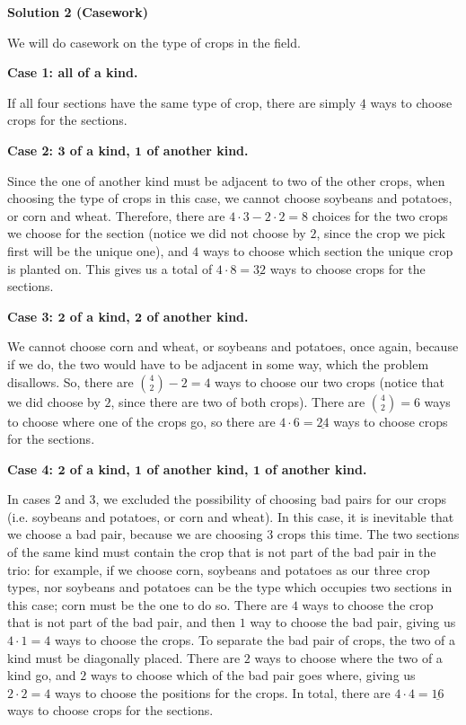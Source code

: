 \begin{enumerate}
\textbf{Solution 2 (Casework)}

We will do casework on the type of crops in the field.

 \textbf{Case 1: all of a kind.}

 If all four sections have the same type of crop, there are simply $\underline{4}$ ways to choose crops for the sections.

 \textbf{Case 2: $\boldsymbol{3}$ of a kind, $\boldsymbol{1}$ of another kind.}

 Since the one of another kind must be adjacent to two of the other crops, when choosing the type of crops in this case, we cannot choose soybeans and potatoes, or corn and wheat. Therefore, there are $4 \cdot 3 - 2 \cdot 2 = 8$ choices for the two crops we choose for the section (notice we did not choose by $2$, since the crop we pick first will be the unique one), and $4$ ways to choose which section the unique crop is planted on. This gives us a total of $4 \cdot 8 = \underline{32}$ ways to choose crops for the sections.

 \textbf{Case 3: $\boldsymbol{2}$ of a kind, $\boldsymbol{2}$ of another kind.}

 We cannot choose corn and wheat, or soybeans and potatoes, once again, because if we do, the two would have to be adjacent in some way, which the problem disallows. So, there are ${4 \choose 2} - 2 = 4$ ways to choose our two crops (notice that we did choose by $2$, since there are two of both crops). There are ${4 \choose 2} = 6$ ways to choose where one of the crops go, so there are $4 \cdot 6 = \underline{24}$ ways to choose crops for the sections.

 \textbf{Case 4: $\boldsymbol{2}$ of a kind, $\boldsymbol{1}$ of another kind, $\boldsymbol{1}$ of another kind.}

 In cases 2 and 3, we excluded the possibility of choosing bad pairs for our crops (i.e. soybeans and potatoes, or corn and wheat). In this case, it is inevitable that we choose a bad pair, because we are choosing $3$ crops this time. The two sections of the same kind must contain the crop that is not part of the bad pair in the trio: for example, if we choose corn, soybeans and potatoes as our three crop types, nor soybeans and potatoes can be the type which occupies two sections in this case; corn must be the one to do so. There are $4$ ways to choose the crop that is not part of the bad pair, and then $1$ way to choose the bad pair, giving us $4 \cdot 1 = 4$ ways to choose the crops. To separate the bad pair of crops, the two of a kind must be diagonally placed. There are $2$ ways to choose where the two of a kind go, and $2$ ways to choose which of the bad pair goes where, giving us $2 \cdot 2 = 4$ ways to choose the positions for the crops. In total, there are $4 \cdot 4 = \underline{16}$ ways to choose crops for the sections.


\end{enumerate}
